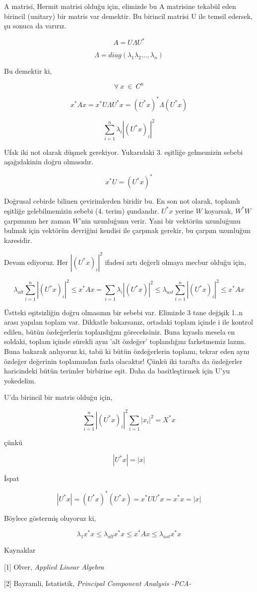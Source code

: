 \documentclass[12pt,fleqn]{article}\usepackage{../../common}
\begin{document}
A matrisi, Hermit matrisi olduğu için, elimizde bu A matrisine tekabül eden
birincil (unitary) bir matris var demektir. Bu birincil matrisi U ile
temsil edersek, şu sonuca da varırız.

$$ A = U \Lambda U^* $$

$$ \Lambda = diag(\lambda_1\lambda_2...,\lambda_n) $$

Bu demektir ki, 

$$ \forall \ x \ \in \ C^n  $$

$$ x^*Ax = x^*U\Lambda U^*x = (U^*x)^*\Lambda(U^*x) $$

$$ \sum_{i=1}^n \lambda_i |(U^*x)_i|^2 $$

Ufak iki not olarak düşmek gerekiyor. Yukarıdaki 3. eşitliğe gelmemizin
sebebi aşağıdakinin doğru olmasıdır.

$$ x^*U = (U^*x)^* $$

Doğrusal cebirde bilinen çevirimlerden biridir bu. En son not olarak,
toplamlı eşitliğe gelebilmemizin sebebi (4. terim) şundandır. $U^*x$ yerine
$W$ koyarsak, $W^*W$ çarpımının her zaman $W$'nin uzunluğunu verir. Yani
bir vektörün uzunluğunu bulmak için vektörün devriğini kendisi ile çarpmak
gerekir, bu çarpım uzunluğun karesidir.

Devam ediyoruz. Her $|(U^*x)_i|^2$ ifadesi artı değerli olmaya mecbur
olduğu için,

$$ \lambda_{alt}\sum_{i=1}^n |(U^*x)_i|^2 \le x^*Ax = 
\sum_{i=1}\lambda_i |(U^*x)|^2 \le
\lambda_{ust}\sum_{i=1}^n |(U^*x)_i|^2 \le x^*Ax 
 $$

Üstteki eşitsizliğin doğru olmasının bir sebebi var. Elimizde 3 tane
değişik 1..n arası yapılan toplam var. Dikkatle bakarsanız, ortadaki
toplam içinde i ile kontrol edilen, bütün özdeğerlerin toplandığını
göreceksiniz. Buna kıyasla mesela en soldaki, toplam içinde sürekli aynı
'alt özdeğer' toplandığını farketmemiz lazım. Buna bakarak anlıyoruz ki,
tabii ki bütün özdeğerlerin toplamı, tekrar eden aynı özdeğer değerinin
toplamından fazla olacaktır! Çünkü iki tarafta da özdeğerler haricindeki
bütün terimler birbirine eşit. Daha da basitleştirmek için U'yu yokedelim.

U'da birincil bir matris olduğu için, 

$$ \sum_{i=1}^n |(U^*x)_i|^2 \sum_{i=1} |x_i|^2 = X^*x  $$

çünkü

$$ |U^*x| = |x|$$

İspat

$$ |U^*x| = (U^*x)^*(U^*x) = x^*UU^*x = x^*x = |x| $$

Böylece göstermiş oluyoruz ki, 

$$ \lambda_1x^*x \le \lambda_{alt}x^*x \le x^*Ax \le \lambda_{ust}x^*x $$ 

Kaynaklar

[1] Olver, {\em Applied Linear Algebra}

[2] Bayramli, Istatistik, {\em Principal Component Analysis -PCA-}
\end{document}
